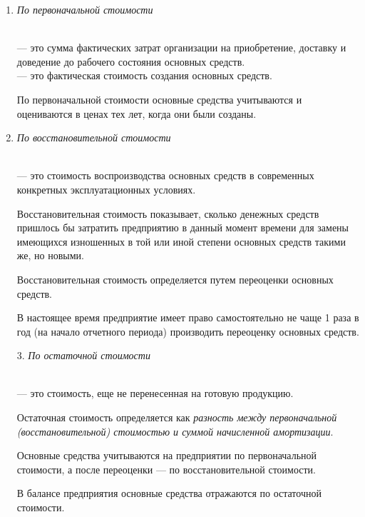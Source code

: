 \begin{enumerate}
    \item \textit{По первоначальной стоимости}

\begin{definition}
    \normalfont
    ~\\
     --- это сумма фактических затрат организации
    на приобретение, доставку и доведение до рабочего состояния основных
    средств.
    ~\\
     --- это фактическая стоимость создания основных средств.
\end{definition}

По первоначальной стоимости основные средства учитываются и оцениваются в ценах
тех лет, когда они были созданы.

\item \textit{По восстановительной стоимости}

\begin{definition}
    \normalfont
    ~\\
     --- это стоимость воспроизводства
    основных средств в современных конкретных эксплуатационных условиях.
\end{definition}

Восстановительная стоимость показывает, сколько денежных средств пришлось бы
затратить предприятию в данный момент времени для замены имеющихся изношенных в
той или иной степени основных средств такими же, но новыми.

Восстановительная стоимость определяется путем переоценки основных средств.

В настоящее время предприятие имеет право самостоятельно не чаще 1 раза в год
(на начало отчетного периода) производить переоценку основных средств.

3. \textit{По остаточной стоимости}

\begin{definition}
    \normalfont
    ~\\
     --- это стоимость, еще не перенесенная на
    готовую продукцию.
\end{definition}

Остаточная стоимость определяется как \textit{разность между первоначальной
(восстановительной) стоимостью и суммой начисленной амортизации}.

Основные средства учитываются на предприятии по первоначальной стоимости, а
после переоценки --- по восстановительной стоимости.

В балансе предприятия основные средства отражаются по остаточной стоимости.
\end{enumerate}

